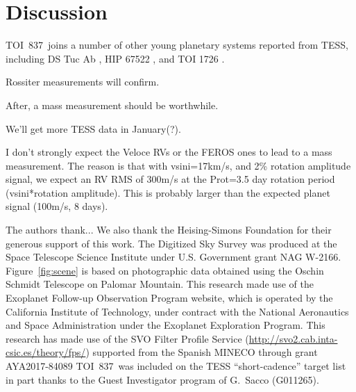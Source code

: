 \documentclass[12pt,twocolumn,tighten]{aastex63}
\newcommand{\tn}{TOI~837} %
\begin{document}
\section{Discussion}
\label{sec:discussion}

\tn\ joins a number of other young planetary systems reported from
TESS, including DS Tuc Ab \citep{newton_tess_2019}, HIP 67522
\citep{rizzuto_tess_2020}, and TOI 1726 \citep{mann_tess_2020}.

Rossiter measurements will confirm.

After, a mass measurement should be worthwhile.

We'll get more TESS data in January(?).

I don't strongly expect the Veloce RVs or the FEROS ones to lead to a
mass measurement. The reason is that with vsini=17km/s, and 2\%
rotation amplitude signal, we expect an RV RMS of 300m/s at the
Prot=3.5 day rotation period (vsini*rotation amplitude). This is
probably larger than the expected planet signal (100m/s, 8 days).










\acknowledgements
%
%
%
The authors thank...
%
We also thank the Heising-Simons Foundation for
their generous support of this work.
%
The Digitized Sky Survey was produced at the Space Telescope Science
Institute under U.S. Government grant NAG W-2166.
Figure~\ref{fig:scene} is based on photographic data obtained using
the Oschin Schmidt Telescope on Palomar Mountain.
%
This research made use of the Exoplanet Follow-up Observation
Program website, which is operated by the California Institute of
Technology, under contract with the National Aeronautics and Space
Administration under the Exoplanet Exploration Program.
%
This research has made use of the SVO Filter Profile Service
(\url{http://svo2.cab.inta-csic.es/theory/fps/}) supported from the Spanish
MINECO through grant AYA2017-84089
%
\tn\ was included on the TESS ``short-cadence'' target list in part
thanks to the Guest Investigator program of G.\ Sacco (G011265).
\end{document}

